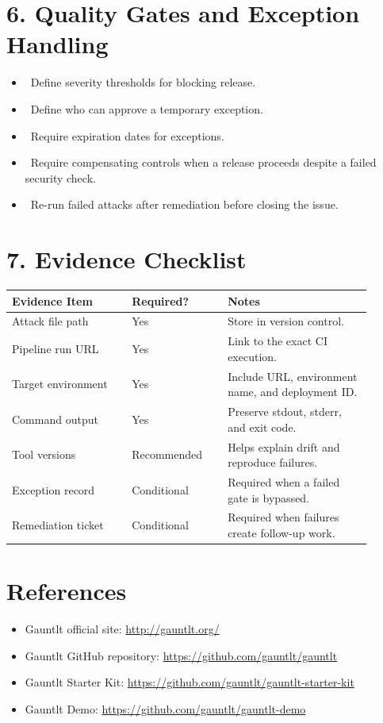 \documentclass[11pt]{article}
\newcommand{\checkbox}{\raisebox{0.2ex}{\fbox{\rule{0pt}{0.9ex}\rule{0.9ex}{0pt}}}}
\begin{document}
\section{6. Quality Gates and Exception Handling}
\begin{itemize}
  \item \checkbox\ Define severity thresholds for blocking release.
  \item \checkbox\ Define who can approve a temporary exception.
  \item \checkbox\ Require expiration dates for exceptions.
  \item \checkbox\ Require compensating controls when a release proceeds despite a failed security check.
  \item \checkbox\ Re-run failed attacks after remediation before closing the issue.
\end{itemize}

\section{7. Evidence Checklist}
\begin{longtable}{@{}L{0.30\linewidth}L{0.24\linewidth}L{0.36\linewidth}@{}}
\toprule
\textbf{Evidence Item} & \textbf{Required?} & \textbf{Notes} \\
\midrule
Attack file path & Yes & Store in version control. \\
Pipeline run URL & Yes & Link to the exact CI execution. \\
Target environment & Yes & Include URL, environment name, and deployment ID. \\
Command output & Yes & Preserve stdout, stderr, and exit code. \\
Tool versions & Recommended & Helps explain drift and reproduce failures. \\
Exception record & Conditional & Required when a failed gate is bypassed. \\
Remediation ticket & Conditional & Required when failures create follow-up work. \\
\bottomrule
\end{longtable}

\section*{References}
\begin{itemize}
  \item Gauntlt official site: \url{http://gauntlt.org/}
  \item Gauntlt GitHub repository: \url{https://github.com/gauntlt/gauntlt}
  \item Gauntlt Starter Kit: \url{https://github.com/gauntlt/gauntlt-starter-kit}
  \item Gauntlt Demo: \url{https://github.com/gauntlt/gauntlt-demo}
\end{itemize}
\end{document}
